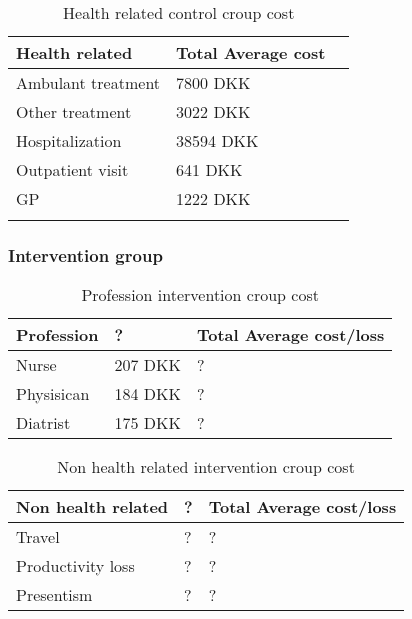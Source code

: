 \begin{table}[H]
\begin{longtabu} to 
    \textbf{Health related}  & \textbf{Total Average cost} \\[-1ex]
    \midrule
     Ambulant treatment    &    7800 DKK \\ \hline
     Other treatment   &     3022 DKK   \\ \hline
     Hospitalization   &      38594 DKK \\ \hline
     Outpatient visit   &      641 DKK \\ \hline
     GP   &      1222 DKK \\ \hline
    \newline
   \end{longtabu}
\caption{Health related control croup cost}
\label{tab: NC}
\end{table}



\subsubsection{Intervention group}

\begin{table}[H]
\begin{longtabu} to 
    \textbf{Profession} &        \textbf{?} & \textbf{Total Average cost/loss} \\[-1ex]
    \midrule
 	Nurse   &    207 DKK & ? \\ \hline
    Physisican   &   184 DKK    & ? \\ \hline
    Diatrist    &     175 DKK    & ?
    \newline
   \end{longtabu}
\caption{Profession intervention croup cost \cite{lonnurse, lonfys, londia}}
\label{tab: PI}
\end{table}

\begin{table}[H]
\begin{longtabu} to 
    \textbf{Non health related} &        \textbf{?} & \textbf{Total Average cost/loss} \\[-1ex]
    \midrule
     Travel   &    ? & ? \\ \hline
     Productivity loss   &       ? & ? \\ \hline
     Presentism   &        ? & ?
    \newline
   \end{longtabu}
\caption{Non health related intervention croup cost}
\label{tab: IC}
\end{table}


